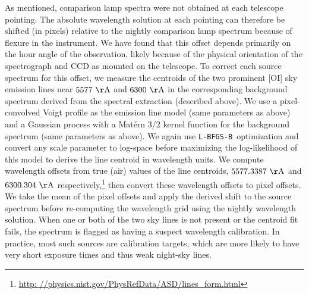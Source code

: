 \documentclass[modern, letterpaper]{aastex61}
\newcommand{\lbfgsb}{\texttt{L-BFGS-B}}
\begin{document}
As mentioned, comparison lamp spectra were not obtained at each telescope
pointing.
The absolute wavelength solution at each pointing can therefore be shifted
(in pixels) relative to the nightly comparison lamp spectrum because of flexure
in the instrument.
We have found that this offset depends primarily on the hour angle of the
observation, likely because of the physical orientation of the spectrograph and
CCD as mounted on the telescope.
To correct each source spectrum for this offset, we measure the centroids of
the two prominent [OI] sky emission lines near $5577~{\rm \AA}$ and $6300~{\rm
\AA}$ in the corresponding background spectrum derived from the spectral
extraction (described above).
We use a pixel-convolved Voigt profile as the emission line model (same
parameters as above) and a Gaussian process with a Mat\'ern 3/2 kernel function
for the background spectrum (same parameters as above).
We again use \lbfgsb\ optimization and convert any scale parameter to log-space
before maximizing the log-likelihood of this model to derive the line centroid
in wavelength units.
We compute wavelength offsets from true (air) values of the line centroids,
$5577.3387~{\rm \AA}$ and $6300.304~{\rm \AA}$ respectively,\footnote{\url{http:
//physics.nist.gov/PhysRefData/ASD/lines_form.html}} then convert these
wavelength offsets to pixel offsets.
We take the mean of the pixel offsets and apply the derived shift to the source
spectrum before re-computing the wavelength grid using the nightly wavelength
solution.
When one or both of the two sky lines is not present or the centroid fit fails,
the spectrum is flagged as having a suspect wavelength calibration.
In practice, most such sources are calibration targets, which are more likely to
have very short exposure times and thus weak night-sky lines.
\end{document}
